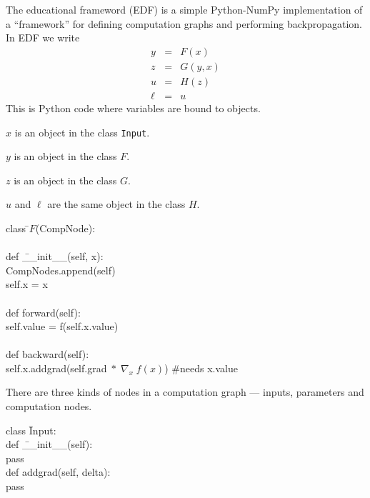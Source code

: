 {

The educational frameword (EDF) is a simple Python-NumPy implementation of a ``framework'' for defining computation graphs
and performing backpropagation. In EDF we write
\begin{eqnarray*}
  y & = & F(x) \\
  z & = & G(y,x) \\
  u & = & H(z) \\
  \ell &  = &  u
\end{eqnarray*}
\medskip
This is Python code where variables are bound to objects.

\medskip
$x$ is an object in the class {\tt Input}.

\medskip
$y$ is an object in the class $F$.

\medskip
$z$ is an object in the class $G$.

\medskip
$u$ and $\ell$ are the same object in the class $H$.


\begin{tabbing}
  class \=$F$(CompNode): \\
  \\
    \>def \=\_\_init\_\_(self, x): \\
        \>\>CompNodes.append(self) \\
        \>\>self.x = x \\
\\
    \>def forward(self): \\
        \>\>self.value = f(self.x.value) \\
\\
    \>def backward(self): \\
        \>\>self.x.addgrad(self.grad$ \;*\; \nabla_x\;f(x)$) \hspace{2em} \#needs x.value
\end{tabbing}


There are three kinds of nodes in a computation graph --- inputs, parameters and computation nodes.

\vfill
\begin{tabbing}
class \=Input: \\
    \>def \=\_\_init\_\_(self): \\
        \>\>pass \\
    \>def \>addgrad(self, delta): \\
    \>\>pass
\end{tabbing}

}
